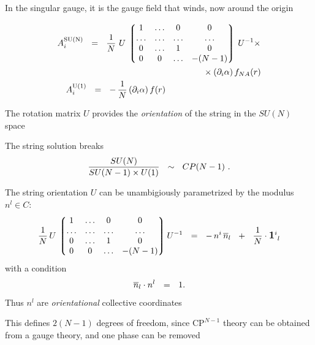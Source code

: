 \documentclass{beamer}
\newcommand{\cp}{$\text{CP}^{N-1}$\,\,}
\begin{document}
\begin{frame}
	In the singular gauge, it is the gauge field that winds, now around the origin

\begin{align*}
%
	A_i^{\rm SU(N)} ~~=~~ \frac{1}{N}\, &\, U\, \lgr \begin{matrix}
					          	1  & \ldots & 0 & 0 \\
						  	\ldots & \ldots & \ldots & \ldots \\
							0  & \ldots  & 1  &  0 \\
							0  & 0   & \ldots  &  - (N-1) 
					         \end{matrix} \rgr  \, U^{-1} \times \\
%
			&	\qquad\qquad\qquad\qquad\qquad     \times(\p_i \alpha)\, f_{NA}(r)  \\
%
	A_i^{\rm U(1)} ~~=~~ -\, & \frac{1}{N}\, (\p_i \alpha)\, f(r) 
\end{align*}

	The rotation matrix $U$ provides the {\it orientation} of the string in the $ SU(N) $ space
\end{frame}


\begin{frame}
\vspace*{\fill}
	The string solution breaks
\[
	\frac{SU(N)}
            {SU(N-1) \times U(1)}         ~~\sim~~  CP(N-1)~\text.
\]
\vspace*{\fill}
\end{frame}


\begin{frame}
	The string orientation $ U $ can be unambigiously parametrized by the modulus $ n^l \in C $:
\[
	\frac{1}{N}\, U \, \lgr \begin{matrix}
				  1  & \ldots & 0 & 0 \\
				  \ldots & \ldots & \ldots & \ldots \\
				  0 & \ldots & 1 & 0  \\
				  0 & 0 & \ldots & -(N-1) 
				\end{matrix} \rgr
			U^{-1}  
	~~=~~
	-\, n^i\,\ov{n}{}_l  ~~+~~ \frac{1}{N}\cdot{\mathlarger{\mathbf{1}}}{}^i_{~l} 
\]
	with a condition
\[
	\overline{n}{}_l \cdot n^l ~~=~~ 1 \text.
\]
	Thus $ n^l $ are \emph{orientational} collective coordinates

	This defines $ 2(N - 1) $ degrees of freedom, since \cp theory can be obtained from a gauge
	theory, and one phase can be removed

\end{frame}
\end{document}
